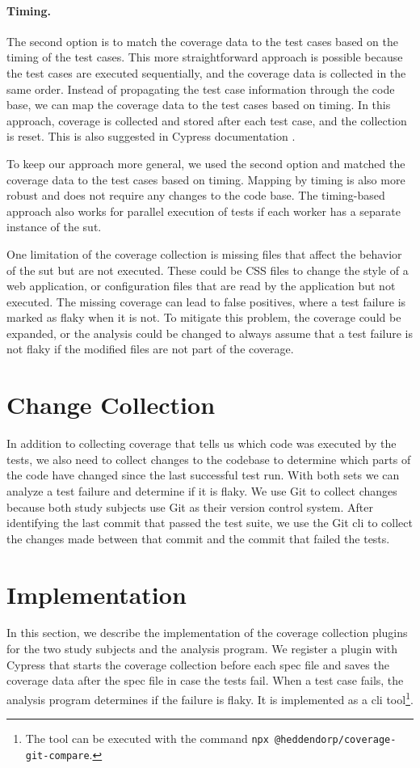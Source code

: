 \paragraph{Timing.} The second option is to match the coverage data to the test cases based on the timing of the test cases.
This more straightforward approach is possible because the test cases are executed sequentially, and the coverage data is collected in the same order.
Instead of propagating the test case information through the code base, we can map the coverage data to the test cases based on timing.
In this approach, coverage is collected and stored after each test case, and the collection is reset.
This is also suggested in Cypress documentation \autocite{noauthor_code_nodate}.

To keep our approach more general, we used the second option and matched the coverage data to the test cases based on timing.
Mapping by timing is also more robust and does not require any changes to the code base.
The timing-based approach also works for parallel execution of tests if each worker has a separate instance of the \ac{sut}.

One limitation of the coverage collection is missing files that affect the behavior of the \ac{sut} but are not executed.
These could be CSS files to change the style of a web application, or configuration files that are read by the application but not executed.
The missing coverage can lead to false positives, where a test failure is marked as flaky when it is not.
To mitigate this problem, the coverage could be expanded, or the analysis could be changed to always assume that a test failure is not flaky if the modified files are not part of the coverage.
\section{Change Collection}
In addition to collecting coverage that tells us which code was executed by the tests, we also need to collect changes to the codebase to determine which parts of the code have changed since the last successful test run.
With both sets we can analyze a test failure and determine if it is flaky.
We use Git to collect changes because both study subjects use Git as their version control system.
After identifying the last commit that passed the test suite, we use the Git \ac{cli} to collect the changes made between that commit and the commit that failed the tests.

\section{Implementation}
In this section, we describe the implementation of the coverage collection plugins for the two study subjects and the analysis program.
We register a plugin with Cypress that starts the coverage collection before each spec file and saves the coverage data after the spec file in case the tests fail.
When a test case fails, the analysis program determines if the failure is flaky.
It is implemented as a \ac{cli} tool\footnote{The tool can be executed with the command \texttt{npx @heddendorp/coverage-git-compare}.}.


